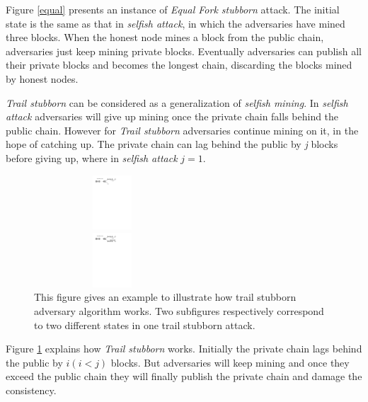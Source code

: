 \documentclass{llncs}
\begin{document}
Figure \ref{equal} presents an instance of \emph{Equal Fork stubborn} attack. The initial state is the same as that in \emph{selfish attack}, in which the adversaries have mined three blocks. When the honest node mines a block from the public chain, adversaries just keep mining private blocks. Eventually adversaries can publish all their private blocks and becomes the longest chain, discarding the blocks mined by honest nodes.

\emph{Trail stubborn} can be considered as a generalization of \emph{selfish mining}. In \emph{selfish attack} adversaries will give up mining once the private chain falls behind the public chain. However for \emph{Trail stubborn} adversaries continue mining on it, in the hope of catching up. The private chain can lag behind the public by \emph{j} blocks before giving up, where in \emph{selfish attack} $j = 1$.

\begin{figure}[!htbp]
\vspace{-3mm}
\begin{minipage}[t]{0.5\linewidth}
\centering
\includegraphics[height=0.8in, width=2.3in]{Figures/Trail-1.pdf}

\end{minipage}%
\begin{minipage}[t]{0.5\linewidth}
\centering
\includegraphics[height=0.8in, width=2.3in]{Figures/Trail-2.pdf}

\end{minipage}

\vspace{0mm}
\setlength{\belowcaptionskip}{-10pt}
\caption{This figure gives an example to illustrate how trail stubborn adversary algorithm works. Two subfigures respectively correspond to two different states in one trail stubborn attack.}
\label{trail}
\vspace{-3mm}
\end{figure}

Figure \ref{trail} explains how \emph{Trail stubborn} works. Initially the private chain lags behind the public by  $i (i < j)$ blocks. But adversaries will keep mining and once they exceed the public chain they will finally publish the private chain and damage the consistency.
\end{document}
